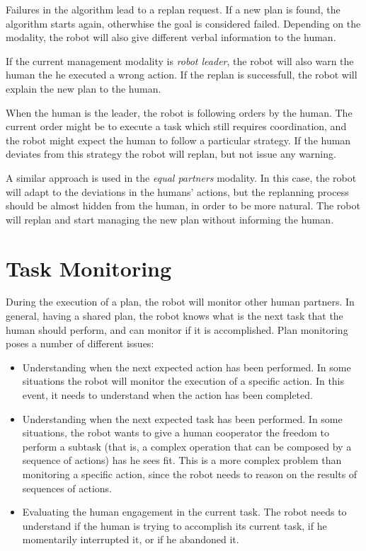 Failures in the algorithm lead to a replan request. If a new plan is found, the algorithm starts again, otherwhise the goal is considered failed. Depending on the modality, the robot will also give different verbal information to the human.

If the current management modality is \textit{robot leader}, the robot will also warn the human the he executed a wrong action. If the replan is successfull, the robot will explain the new plan to the human. 

When the human is the leader, the robot is following orders by the human. The current order might be to execute a task which still requires coordination, and the robot might expect the human to follow a particular strategy. If the human deviates from this strategy the robot will replan, but not issue any warning.

A similar approach is used in the \textit{equal partners} modality. In this case, the robot will adapt to the deviations in the humans' actions, but the replanning process should be almost hidden from the human, in order to be more natural. The robot will replan and start managing the new plan without informing the human.


\section{Task Monitoring}
\label{sec:plan_management-plan_monitoring}

During the execution of a plan, the robot will monitor other human partners. In general, having a shared plan, the robot knows what is the next task that the human should perform, and can monitor if it is accomplished. Plan monitoring poses a number of different issues:
\begin{itemize}
\item Understanding when the next expected action has been performed. In some situations the robot will monitor the execution of a specific action. In this event, it needs to understand when the action has been completed.
\item Understanding when the next expected task has been performed. In some situations, the robot wants to give a human cooperator the freedom to perform a subtask (that is, a complex operation that can be composed by a sequence of actions) has he sees fit. This is a more complex problem than monitoring a specific action, since the robot needs to reason on the results of sequences of actions.
\item Evaluating the human engagement in the current task. The robot needs to understand if the human is trying to accomplish its current task, if he momentarily interrupted it, or if he abandoned it.
\end{itemize}

